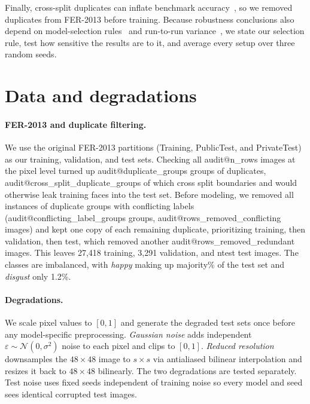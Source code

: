 \documentclass{article}
\begin{document}
Finally, cross-split duplicates can inflate benchmark accuracy~\cite{barz2020purging}, so we removed duplicates from
FER-2013 before training. Because robustness conclusions also depend on model-selection rules~\cite{gulrajani2021search}
and run-to-run variance~\cite{bouthillier2021variance}, we state our selection rule, test how sensitive the results are
to it, and average every setup over three random seeds.

\section{Data and degradations}
\label{sec:data}

\paragraph{FER-2013 and duplicate filtering.}
We use the original FER-2013 partitions (Training, PublicTest, and PrivateTest) as our training, validation, and test
sets. Checking all \num{audit@n_rows} images at the pixel level turned up \num{audit@duplicate_groups} groups of duplicates,
\num{audit@cross_split_duplicate_groups} of which cross split boundaries and would otherwise leak training faces into
the test set. Before modeling, we removed all instances of duplicate groups with conflicting labels
(\num{audit@conflicting_label_groups} groups, \num{audit@rows_removed_conflicting} images) and kept one copy of each
remaining duplicate, prioritizing training, then validation, then test, which removed another
\num{audit@rows_removed_redundant} images. This leaves 27,418 training, 3,291 validation, and \num{ntest} test images.
The classes are imbalanced, with \emph{happy} making up \num{majority}\% of the test set and \emph{disgust} only 1.2\%.

\paragraph{Degradations.}
We scale pixel values to $[0,1]$ and generate the degraded test sets once before any model-specific preprocessing.
\emph{Gaussian noise} adds independent $\varepsilon\sim\mathcal{N}(0,\sigma^2)$ noise to each pixel and clips to
$[0,1]$. \emph{Reduced resolution} downsamples the $48{\times}48$ image to $s{\times}s$ via antialiased bilinear
interpolation and resizes it back to $48{\times}48$ bilinearly. The two degradations are tested separately. Test
noise uses fixed seeds independent of training noise so every model and seed sees identical corrupted test images.
\end{document}
